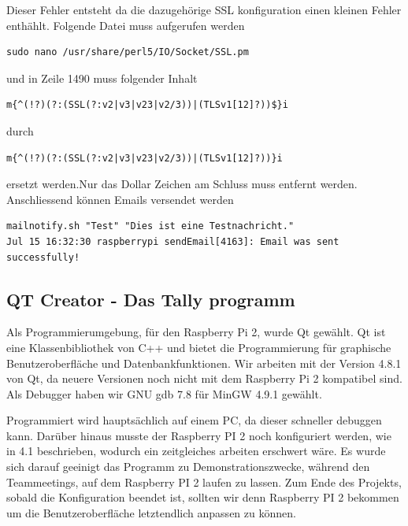 \documentclass[11pt,a4paper]{article} %
\begin{document}
Dieser Fehler entsteht da die dazugeh\"orige SSL konfiguration einen kleinen Fehler enth\"ahlt.
Folgende Datei muss aufgerufen werden
\begin{frame}

\begin{lstlisting}
sudo nano /usr/share/perl5/IO/Socket/SSL.pm

\end{lstlisting}
\end{frame}

und in Zeile 1490 muss folgender Inhalt
\begin{frame}

\begin{lstlisting}
m{^(!?)(?:(SSL(?:v2|v3|v23|v2/3))|(TLSv1[12]?))$}i

\end{lstlisting}
\end{frame}

durch
\begin{frame}

\begin{lstlisting}
m{^(!?)(?:(SSL(?:v2|v3|v23|v2/3))|(TLSv1[12]?))}i

\end{lstlisting}
\end{frame}

ersetzt werden.Nur das Dollar Zeichen am Schluss muss entfernt werden. Anschliessend k\"onnen Emails versendet werden
\begin{frame}

\begin{lstlisting}
mailnotify.sh "Test" "Dies ist eine Testnachricht."
Jul 15 16:32:30 raspberrypi sendEmail[4163]: Email was sent successfully!

\end{lstlisting}
\end{frame}
\par











\subsection{QT Creator - Das Tally programm}
Als Programmierumgebung, für den Raspberry Pi 2, wurde Qt gewählt.
Qt ist eine Klassenbibliothek von C++ und bietet die Programmierung für  graphische Benutzeroberfläche und Datenbankfunktionen.
Wir arbeiten mit der Version 4.8.1 von Qt, da neuere Versionen noch nicht mit dem Raspberry Pi 2 kompatibel sind.
Als Debugger haben wir GNU gdb 7.8 für MinGW 4.9.1 gewählt.
\par
Programmiert wird hauptsächlich auf einem PC, da dieser schneller debuggen kann.
Darüber hinaus musste der Raspberry PI 2 noch konfiguriert werden, wie in 4.1 beschrieben, wodurch ein zeitgleiches arbeiten erschwert wäre.
Es wurde sich darauf geeinigt das Programm zu Demonstrationszwecke, während den Teammeetings, auf dem Raspberry PI 2 laufen zu lassen.
Zum Ende des Projekts, sobald die Konfiguration beendet ist, sollten wir denn Raspberry PI 2 bekommen um die Benutzeroberfläche letztendlich anpassen zu können.
\par
\end{document}
